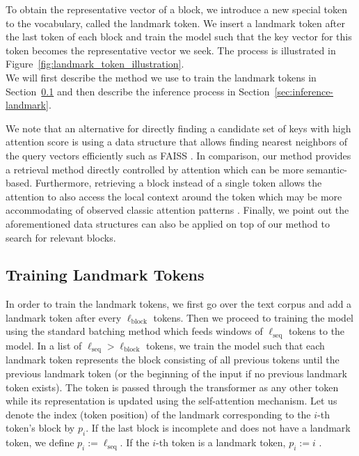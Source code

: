 To obtain the representative vector of a block, we introduce a new special token to the vocabulary, called the landmark token. We insert a landmark token after the last token of each block and train the model such that the key vector for this token becomes the representative vector we seek. The process is illustrated in Figure~\ref{fig:landmark_token_illustration}.
\\
We will first describe the method we use to train the landmark tokens in Section~\ref{sec:train-landmark} and then describe the inference process in Section~\ref{sec:inference-landmark}.

We note that an alternative for directly finding a candidate set of keys with high attention score is using a data structure that allows finding nearest neighbors of the query vectors efficiently such as FAISS \cite{johnson_billion-scale_2017}. In comparison, our method provides a retrieval method directly controlled by attention which can be more semantic-based. Furthermore, retrieving a block instead of a single token allows the attention to also access the local context around the token which may be more accommodating of observed classic attention patterns \cite{kovaleva_revealing_2019}. Finally, we point out the aforementioned data structures can also be applied on top of our method to search for relevant blocks.

\subsection{Training Landmark Tokens}
\label{sec:train-landmark}
In order to train the landmark tokens, we first go over the text corpus and add a landmark token after every $\ell_{\text{block}}$ tokens. Then we proceed to training the model using the standard batching method which feeds windows of $\ell_{\text{seq}}$ tokens to the model. In a list of $\ell_{\text{seq}}>\ell_{\text{block}}$ tokens, we train the model such that each landmark token represents the block consisting of all previous tokens until the previous landmark token (or the beginning of the input if no previous landmark token exists). The token is passed through the transformer as any other token while its representation is updated using the self-attention mechanism. Let us denote the index (token position) of the landmark corresponding to the $i$-th token's block by $p_i$. If the last block is incomplete and does not have a landmark token, we define $p_i := \ell_{\text{seq}}$. If the $i$-th token is a landmark token, $p_i := i$ .

